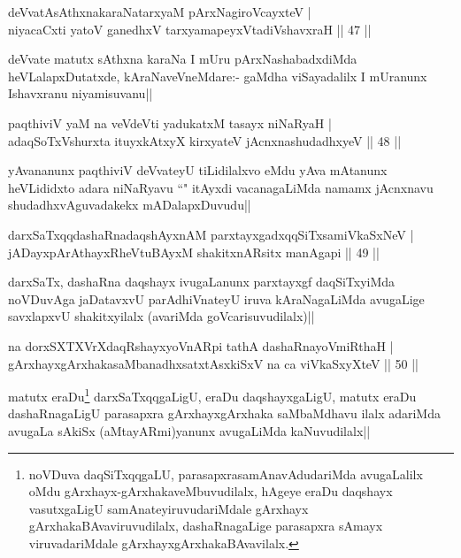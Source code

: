 
\begin{shl}
deVvatAsAthxnakaraNatarxyaM pArxNagiroVcayxteV |\\
niyacaCxti yatoV ganedhxV tarxyamapeyxVtadiVshavxraH \hfill || 47 ||
\end{shl}

\begin{artha}
deVvate matutx sAthxna karaNa I mUru pArxNashabadxdiMda heVLalapxDutatxde, kAraNaveVneMdare:- gaMdha viSayadalilx I mUranunx Ishavxranu niyamisuvanu||
\end{artha}


\begin{shl}
paqthiviV yaM na veVdeVti yadukatxM tasayx niNaRyaH |\\
adaqSoTxV\s shurxta ituyxkAtxyX kirxyateV jAcnxnashudadhxyeV \hfill || 48 ||
\end{shl}

\begin{artha}
yAvananunx paqthiviV deVvateyU tiLidilalxvo eMdu yAva mAtanunx heVLididxto adara niNaRyavu ``\stext " itAyxdi vacanagaLiMda namamx jAcnxnavu shudadhxvAguvadakekx mADalapxDuvudu||
\end{artha}


\begin{shl}
darxSaTxqqdashaRnadaqshAyxnAM parxtayxgadxqqSiTxsamiVkaSxNeV |\\
jADayxpArAthayxRheVtuBAyxM shakitxnARsitx manAgapi \hfill || 49 ||
\end{shl}

\begin{artha}
darxSaTx, dashaRna daqshayx ivugaLanunx parxtayxgf daqSiTxyiMda noVDuvAga jaDatavxvU parAdhiVnateyU iruva kAraNagaLiMda avugaLige savxlapxvU shakitxyilalx (avariMda goVcarisuvudilalx)||
\end{artha}

\begin{shl}
na dorxSXTXVrXdaqRshayxyoVnARpi tathA dashaRnayoVmiRthaH |\\
gArxhayxgArxhakasaMbanadhxsatxtAsxkiSxV na ca viVkaSxyXteV \hfill || 50 ||
\end{shl}

\begin{artha}%
matutx eraDu\footnote[1]{noVDuva daqSiTxqqgaLU, parasapxrasamAnavAdudariMda avugaLalilx oMdu gArxhayx-gArxhakaveMbuvudilalx, hAgeye eraDu daqshayx vasutxgaLigU samAnateyiruvudariMdale gArxhayx gArxhakaBAvaviruvudilalx, dashaRnagaLige parasapxra sAmayx viruvadariMdale gArxhayxgArxhakaBAvavilalx.} darxSaTxqqgaLigU, eraDu daqshayxgaLigU, matutx eraDu dashaRnagaLigU parasapxra gArxhayxgArxhaka saMbaMdhavu ilalx adariMda avugaLa sAkiSx (aMtayARmi)yanunx avugaLiMda kaNuvudilalx||
\end{artha}

